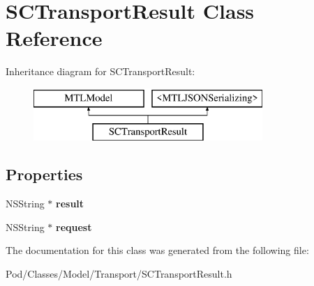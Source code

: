\hypertarget{interface_s_c_transport_result}{}\section{S\+C\+Transport\+Result Class Reference}
\label{interface_s_c_transport_result}
Inheritance diagram for S\+C\+Transport\+Result\+:\begin{figure}[H]
\begin{center}
\leavevmode
\includegraphics[height=2.000000cm]{interface_s_c_transport_result}
\end{center}
\end{figure}
\subsection*{Properties}
\begin{DoxyCompactItemize}
\item 
N\+S\+String $\ast$ {\bfseries result}\hypertarget{interface_s_c_transport_result_ade1479362c4f59fb7c3d300bfa907077}{}\label{interface_s_c_transport_result_ade1479362c4f59fb7c3d300bfa907077}

\item 
N\+S\+String $\ast$ {\bfseries request}\hypertarget{interface_s_c_transport_result_ab784109ba6d6b5fe1717e9fd0203bc85}{}\label{interface_s_c_transport_result_ab784109ba6d6b5fe1717e9fd0203bc85}

\end{DoxyCompactItemize}


The documentation for this class was generated from the following file\+:\begin{DoxyCompactItemize}
\item 
Pod/\+Classes/\+Model/\+Transport/S\+C\+Transport\+Result.\+h\end{DoxyCompactItemize}
